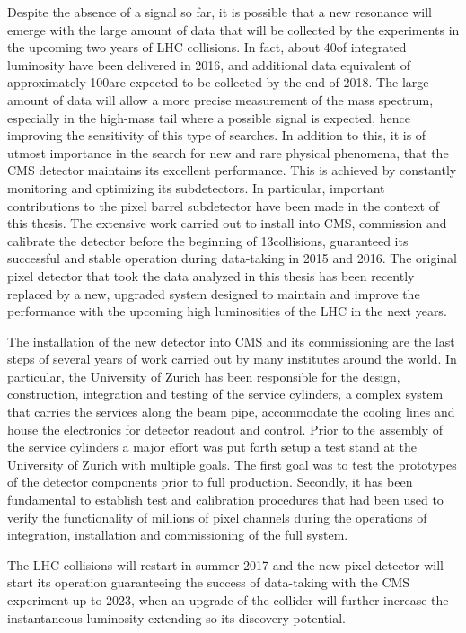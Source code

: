 Despite the absence of a signal so far, it is possible that a new resonance will emerge with the large amount of data that will be collected by the experiments in the upcoming two years of LHC collisions.
In fact, about 40\fbinv of integrated luminosity have been delivered in 2016, and additional data equivalent of approximately 100\fbinv are expected to be collected by the end of 2018.
The large amount of data will allow a more precise measurement of the mass spectrum, especially in the high-mass tail where a possible signal is expected, hence improving the sensitivity of this type of searches.
In addition to this, it is of utmost importance in the search for new and rare physical phenomena, that the CMS detector maintains its excellent performance.
This is achieved by constantly monitoring and optimizing its subdetectors. In particular, important contributions to the pixel barrel subdetector have been made in the context of this thesis.
The extensive work carried out to install into CMS, commission and calibrate the detector before the beginning of 13\TeV collisions, guaranteed its successful and stable operation during data-taking in 2015 and 2016.
The original pixel detector that took the data analyzed in this thesis has been recently replaced by a new, upgraded system designed to maintain and improve the performance with the upcoming high luminosities of the LHC in the next years.

The installation of the new detector into CMS and its commissioning are the last steps of several years of work carried out by many institutes around the world. In particular, the University of Zurich has been responsible for the design, construction, integration and testing of the service cylinders, a complex system that carries the services along the beam pipe, accommodate the cooling lines and house the electronics for detector readout and control.
Prior to the assembly of the service cylinders a major effort was put forth setup a test stand at the University of Zurich with multiple goals. The first goal was to test the prototypes of the detector components prior to full production. Secondly, it has been fundamental to establish test and calibration procedures that had been used to verify the functionality of millions of pixel channels during the operations of integration, installation and commissioning of the full system.

The LHC collisions will restart in summer 2017 and the new pixel detector will start its operation guaranteeing the success of data-taking with the CMS experiment up to 2023, when an upgrade of the collider will further increase the instantaneous luminosity extending so its discovery potential.

